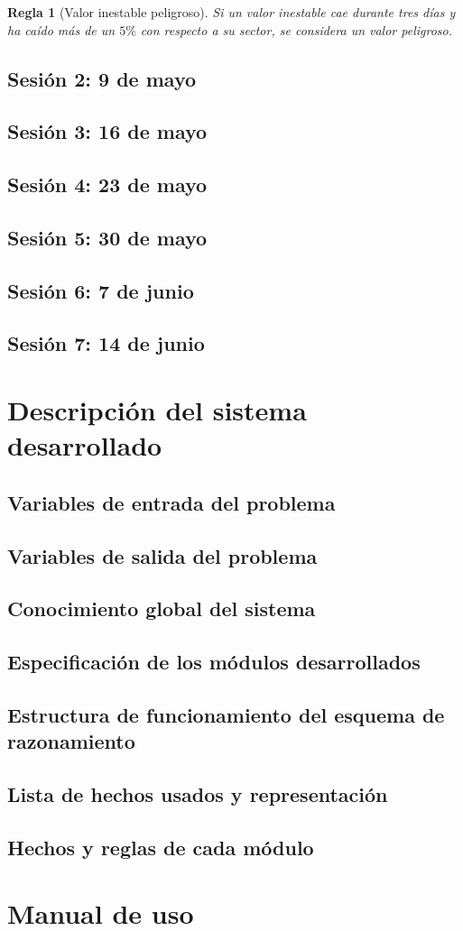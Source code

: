\documentclass[11pt,leqno]{article}
\theoremstyle{definition_wo_parentheses}
\theoremstyle{plain}
\newtheorem{regla}{Regla}[subsection]
\theoremstyle{remark}
\begin{document}
\begin{regla}[Valor inestable peligroso]
	Si un valor inestable cae durante tres días y ha caído más de un $5\%$ con respecto a su sector, se considera un valor peligroso.
\end{regla}

\subsection{Sesión 2:  9 de mayo}
\subsection{Sesión 3: 16 de mayo}
\subsection{Sesión 4: 23 de mayo}
\subsection{Sesión 5: 30 de mayo}
\subsection{Sesión 6: 7 de junio}
\subsection{Sesión 7: 14 de junio}

\section{Descripción del sistema desarrollado}

\subsection{Variables de entrada del problema}
\subsection{Variables de salida del problema}
\subsection{Conocimiento global del sistema}
\subsection{Especificación de los módulos desarrollados}
\subsection{Estructura de funcionamiento del esquema de razonamiento}
\subsection{Lista de hechos usados y representación}
\subsection{Hechos y reglas de cada módulo}


\section{Manual de uso}
\end{document}
